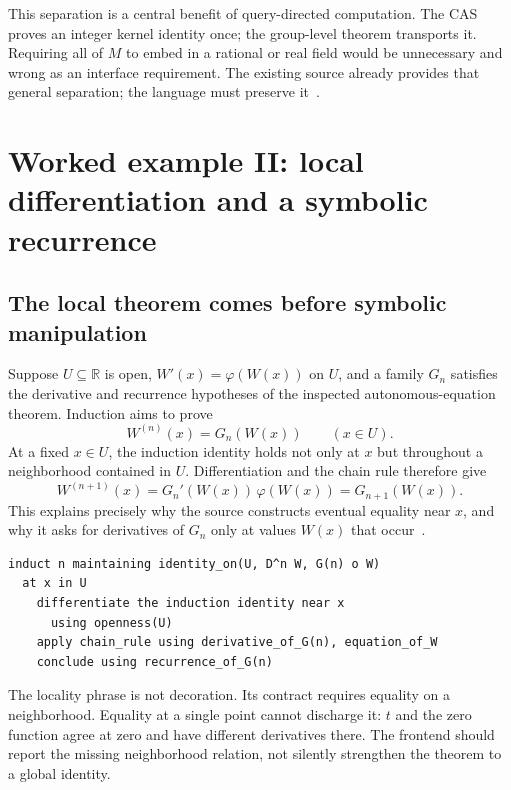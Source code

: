 \documentclass[11pt,a4paper]{article}
\newcommand{\R}{\mathbb R}
\theoremstyle{definition}
\begin{document}
This separation is a central benefit of query-directed computation. The CAS proves an integer kernel identity once; the group-level theorem transports it. Requiring all of \(M\) to embed in a rational or real field would be unnecessary and wrong as an interface requirement. The existing source already provides that general separation; the language must preserve it~\cite{pbin}.

\section{Worked example II: local differentiation and a symbolic recurrence}\label{sec:deriv}

\subsection{The local theorem comes before symbolic manipulation}
Suppose \(U\subseteq\R\) is open, \(W'(x)=\varphi(W(x))\) on \(U\), and a family \(G_n\) satisfies the derivative and recurrence hypotheses of the inspected autonomous-equation theorem. Induction aims to prove
\[
          W^{(n)}(x)=G_n(W(x))\qquad(x\in U).
\]
At a fixed \(x\in U\), the induction identity holds not only at \(x\) but throughout a neighborhood contained in \(U\). Differentiation and the chain rule therefore give
\[
 W^{(n+1)}(x)=G_n'(W(x))\,\varphi(W(x))=G_{n+1}(W(x)).
\]
This explains precisely why the source constructs eventual equality near \(x\), and why it asks for derivatives of \(G_n\) only at values \(W(x)\) that occur~\cite{pode}.

\par\noindent\begin{minipage}{\linewidth}
\begin{lstlisting}
induct n maintaining identity_on(U, D^n W, G(n) o W)
  at x in U
    differentiate the induction identity near x
      using openness(U)
    apply chain_rule using derivative_of_G(n), equation_of_W
    conclude using recurrence_of_G(n)
\end{lstlisting}
\end{minipage}\par

The locality phrase is not decoration. Its contract requires equality on a neighborhood. Equality at a single point cannot discharge it: \(t\) and the zero function agree at zero and have different derivatives there. The frontend should report the missing neighborhood relation, not silently strengthen the theorem to a global identity.
\end{document}
